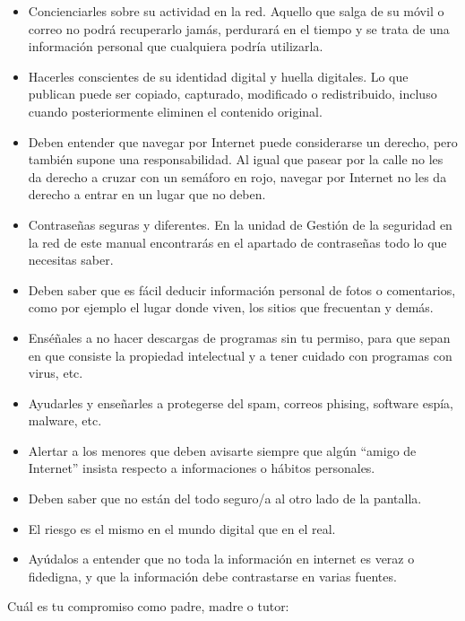 \documentclass[
  spanish,
  a4paper,
  openany]{book}
\begin{document}
\begin{itemize}
\item
  Concienciarles sobre su actividad en la red. Aquello que salga de su móvil o correo no podrá recuperarlo jamás, perdurará en el tiempo y se trata de una información personal que cualquiera podría utilizarla.
\item
  Hacerles conscientes de su identidad digital y huella digitales. Lo que publican puede ser copiado, capturado, modificado o redistribuido, incluso cuando posteriormente eliminen el contenido original.
\item
  Deben entender que navegar por Internet puede considerarse un derecho, pero también supone una responsabilidad. Al igual que pasear por la calle no les da derecho a cruzar con un semáforo en rojo, navegar por Internet no les da derecho a entrar en un lugar que no deben.
\item
  Contraseñas seguras y diferentes. En la unidad de Gestión de la seguridad en la red de este manual encontrarás en el apartado de contraseñas todo lo que necesitas saber.
\item
  Deben saber que es fácil deducir información personal de fotos o comentarios, como por ejemplo el lugar donde viven, los sitios que frecuentan y demás.
\item
  Enséñales a no hacer descargas de programas sin tu permiso, para que sepan en que consiste la propiedad intelectual y a tener cuidado con programas con virus, etc.
\item
  Ayudarles y enseñarles a protegerse del spam, correos phising, software espía, malware, etc.
\item
  Alertar a los menores que deben avisarte siempre que algún ``amigo de Internet'' insista respecto a informaciones o hábitos personales.
\item
  Deben saber que no están del todo seguro/a al otro lado de la pantalla.
\item
  El riesgo es el mismo en el mundo digital que en el real.
\item
  Ayúdalos a entender que no toda la información en internet es veraz o fidedigna, y que la información debe contrastarse en varias fuentes.
\end{itemize}

Cuál es tu compromiso como padre, madre o tutor:
\end{document}
